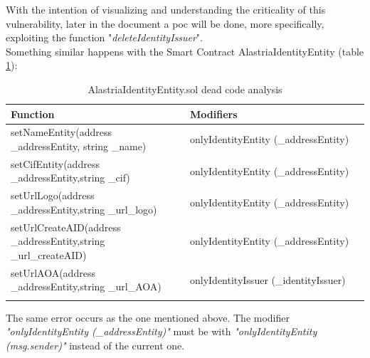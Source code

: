 \documentclass[a4paper, 12pt]{article} %
\begin{document}
            With the intention of visualizing and understanding the criticality of this vulnerability, later in the document a \acrfull{poc} will be done, more specifically, exploiting the function "\textit{deleteIdentityIssuer}".\\
            
            Something similar happens with the Smart Contract AlastriaIdentityEntity (table \ref{tab:dead-code-entity}):
            
            \begin{longtable}{||p{0.5\linewidth} | p{0.5\linewidth}||}
                \hline
                \textbf{Function}  & \textbf{Modifiers}\\ [0.5ex] 
                \hline\hline
                setNameEntity\newline (address \_addressEntity, string \_name) & onlyIdentityEntity (\_addressEntity)\\
                \hline
                setCifEntity\newline (address \_addressEntity,\newline string \_cif) & onlyIdentityEntity (\_addressEntity)\\
                \hline
                setUrlLogo\newline (address \_addressEntity,\newline string \_url\_logo) & onlyIdentityEntity (\_addressEntity)\\
                \hline
                setUrlCreateAID\newline (address \_addressEntity,\newline string \_url\_createAID) & onlyIdentityEntity (\_addressEntity)\\
                \hline
                setUrlAOA\newline (address \_addressEntity,\newline string \_url\_AOA)  & onlyIdentityIssuer (\_identityIssuer)\\[1ex] 
                \hline
                \caption{AlastriaIdentityEntity.sol dead code analysis}
                \label{tab:dead-code-entity}
            \end{longtable}
            The same error occurs as the one mentioned above. The modifier \textit{"onlyIdentityEntity (\_addressEntity)"} must be with \textit{"onlyIdentityEntity (msg.sender)"} instead of the current one.\\
            
\end{document}

